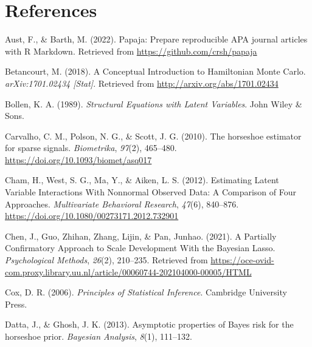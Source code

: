 \documentclass[
  man, donotrepeattitle,floatsintext]{apa6}
\newlength{\cslhangindent}
\newlength{\cslentryspacingunit} %
\newenvironment{CSLReferences}[2] %
 {%
  \setlength{\parindent}{0pt}
  \ifodd #1
  \let\oldpar\par
  \def\par{\hangindent=\cslhangindent\oldpar}
  \fi
  \setlength{\parskip}{#2\cslentryspacingunit}
 }%
 {}
\begin{document}
\hypertarget{references}{%
\section{References}\label{references}}

\begingroup
\setlength{\parindent}{-0.5in}
\setlength{\leftskip}{0.5in}

\hypertarget{refs}{}
\begin{CSLReferences}{1}{0}
\leavevmode{}%
Aust, F., \& Barth, M. (2022). Papaja: {Prepare} reproducible {APA} journal articles with {R} {Markdown}. Retrieved from \url{https://github.com/crsh/papaja}

\leavevmode{}%
Betancourt, M. (2018). A {Conceptual} {Introduction} to {Hamiltonian} {Monte} {Carlo}. \emph{arXiv:1701.02434 {[}Stat{]}}. Retrieved from \url{http://arxiv.org/abs/1701.02434}

\leavevmode{}%
Bollen, K. A. (1989). \emph{Structural {Equations} with {Latent} {Variables}}. John Wiley \& Sons.

\leavevmode{}%
Carvalho, C. M., Polson, N. G., \& Scott, J. G. (2010). The horseshoe estimator for sparse signals. \emph{Biometrika}, \emph{97}(2), 465--480. \url{https://doi.org/10.1093/biomet/asq017}

\leavevmode{}%
Cham, H., West, S. G., Ma, Y., \& Aiken, L. S. (2012). Estimating {Latent} {Variable} {Interactions} {With} {Nonnormal} {Observed} {Data}: {A} {Comparison} of {Four} {Approaches}. \emph{Multivariate Behavioral Research}, \emph{47}(6), 840--876. \url{https://doi.org/10.1080/00273171.2012.732901}

\leavevmode{}%
Chen, J., Guo, Zhihan, Zhang, Lijin, \& Pan, Junhao. (2021). A {Partially} {Confirmatory} {Approach} to {Scale} {Development} {With} the {Bayesian} {Lasso}. \emph{Psychological Methods}, \emph{26}(2), 210--235. Retrieved from \url{https://oce-ovid-com.proxy.library.uu.nl/article/00060744-202104000-00005/HTML}

\leavevmode{}%
Cox, D. R. (2006). \emph{Principles of {Statistical} {Inference}}. Cambridge University Press.

\leavevmode{}%
Datta, J., \& Ghosh, J. K. (2013). Asymptotic properties of {Bayes} risk for the horseshoe prior. \emph{Bayesian Analysis}, \emph{8}(1), 111--132.


\end{CSLReferences}
\end{document}
